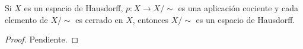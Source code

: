 

\begin{theorem}
Si $X$ es un espacio de Hausdorff, $p : X \longrightarrow X/\sim$ es una aplicación cociente y cada elemento de $X/\sim$ es cerrado en $X$, entonces $X/\sim$ es un espacio de Hausdorff.
\end{theorem}

\begin{proof}
Pendiente.
\end{proof}

